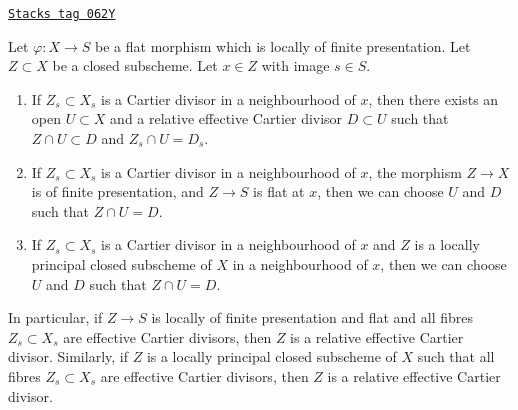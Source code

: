 \begin{lemma}
\label{divisors-lemma-fibre-Cartier}
\href{https://stacks.math.columbia.edu/tag/062Y}{\texttt{Stacks tag 062Y}}

Let $\varphi : X \to S$ be a flat morphism which is locally of finite
presentation. Let $Z \subset X$ be a closed subscheme.
Let $x \in Z$ with image $s \in S$.
\begin{enumerate}
\item If $Z_s \subset X_s$ is a Cartier divisor in a neighbourhood of $x$,
then there exists an open $U \subset X$ and a
relative effective Cartier divisor $D \subset U$ such that
$Z \cap U \subset D$ and $Z_s \cap U = D_s$.
\item If $Z_s \subset X_s$ is a Cartier divisor in a neighbourhood of $x$,
the morphism $Z \to X$ is of finite presentation, and $Z \to S$ is flat at
$x$, then we can choose $U$ and $D$ such that $Z \cap U = D$.
\item If $Z_s \subset X_s$ is a Cartier divisor in a neighbourhood of $x$
and $Z$ is a locally principal closed subscheme of $X$ in a neighbourhood
of $x$, then we can choose $U$ and $D$ such that $Z \cap U = D$.
\end{enumerate}
In particular, if $Z \to S$ is locally of finite presentation and flat and
all fibres $Z_s \subset X_s$ are effective Cartier divisors, then
$Z$ is a relative effective Cartier divisor. Similarly, if $Z$
is a locally principal closed subscheme of $X$ such that all fibres
$Z_s \subset X_s$ are effective Cartier divisors, then
$Z$ is a relative effective Cartier divisor.
\end{lemma}

